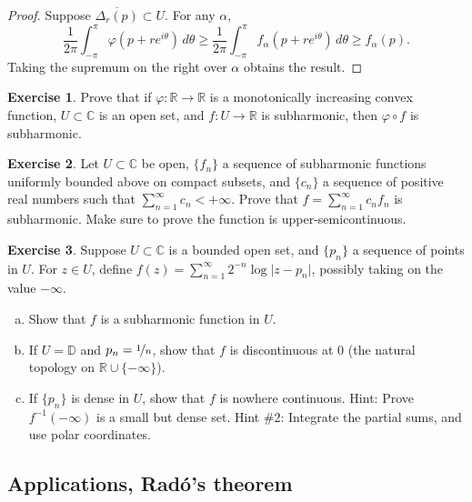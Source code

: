 \documentclass[12pt,openany]{book}
\newcommand{\sabs}[1]{\lvert {#1} \rvert}
\newcommand{\C}{{\mathbb{C}}}
\newcommand{\R}{{\mathbb{R}}}
\newcommand{\D}{{\mathbb{D}}}
\theoremstyle{plain}
\theoremstyle{remark}
\theoremstyle{definition}
\newenvironment{exbox}{%
    \def\FrameCommand{\vrule width 1pt \relax\hspace{10pt}}%
    \MakeFramed{\advance\hsize-\width\FrameRestore}%
}{%
    \endMakeFramed
}
\newenvironment{exparts}{%
    \leavevmode\begin{enumerate}[a),noitemsep,topsep=0pt,parsep=0pt,partopsep=0pt]
}{%
    \end{enumerate}
}
\theoremstyle{exercise}
\newtheorem{exercise}{Exercise}[section]
\theoremstyle{example}
\begin{document}
\begin{proof}
Suppose $\overline{\Delta_r(p)} \subset U$.  For any $\alpha$,
\begin{equation*}
\frac{1}{2\pi} \int_{-\pi}^{\pi} \varphi (p+re^{i\theta})\, d\theta 
\geq
\frac{1}{2\pi} \int_{-\pi}^{\pi} f_\alpha (p+re^{i\theta})\, d\theta 
\geq f_\alpha(p) .
\end{equation*}
Taking the supremum on the right over $\alpha$ obtains the result.
\end{proof}

\begin{exbox}
\begin{exercise}
Prove that if $\varphi \colon \R \to \R$ is a monotonically increasing
convex function, $U \subset \C$ is an open set, and $f \colon U \to \R$
is subharmonic, then $\varphi \circ f$ is subharmonic.
\end{exercise}

\begin{exercise}
Let $U \subset \C$ be open, $\{ f_n \}$ a sequence of 
subharmonic functions uniformly bounded above on compact subsets, and 
$\{ c_n \}$ a sequence of positive real numbers such that
$\sum_{n=1}^\infty c_n < +\infty$.
Prove that $f = \sum_{n=1}^\infty c_n f_n$ is subharmonic.  Make sure to prove
the function is upper-semicontinuous.
\end{exercise}

\begin{exercise}
Suppose $U \subset \C$ is a bounded open set, and $\{ p_n \}$ a sequence of points in
$U$. For $z \in U$, define
$f(z) = \sum_{n=1}^\infty 2^{-n} \log \sabs{z-p_n}$, possibly taking on the
value $-\infty$.
\begin{exparts}
\item
Show that $f$ is a subharmonic function in $U$.
\item
If $U = \D$ and $p_n = \nicefrac{1}{n}$, show that $f$ is discontinuous at $0$
(the natural topology on $\R \cup \{ -\infty \}$).
\item
If $\{ p_n \}$ is dense in $U$, show that $f$ 
is nowhere continuous.
Hint: Prove $f^{-1}(-\infty)$ is a small but dense set.
Hint \#2: Integrate the partial sums, and use polar coordinates.
\end{exparts}
\end{exercise}
\end{exbox}

\subsection{Applications, Rad\'o's theorem}
\end{document}
